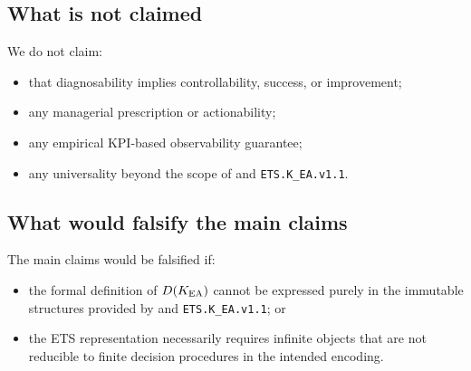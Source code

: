%

\providecommand{\ETSK}{\texttt{ETS.\allowbreak K\_EA.\allowbreak v1.1}}

\subsection{What is not claimed}
We do not claim:
\begin{itemize}
  \item that diagnosability implies controllability, success, or improvement;
  \item any managerial prescription or actionability;
  \item any empirical KPI-based observability guarantee;
  \item any universality beyond the scope of \OC{} and \ETSK.
\end{itemize}

\subsection{What would falsify the main claims}
The main claims would be falsified if:
\begin{itemize}
  \item the formal definition of \(D(K_{\mathrm{EA}})\) cannot be expressed purely in the
        immutable structures provided by \OC{} and \ETSK; or
  \item the ETS representation necessarily requires infinite objects that are not
        reducible to finite decision procedures in the intended encoding.
\end{itemize}

